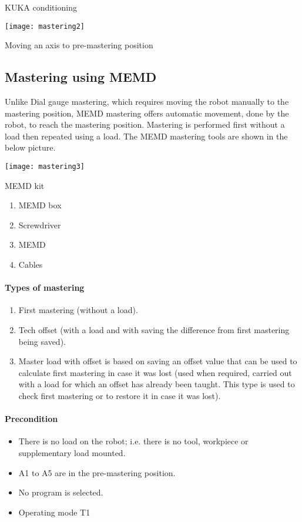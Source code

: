 \documentclass{book}
\begin{document}
\begin{chapter}{KUKA conditioning}
	
	\begin{center}
		\texttt{[image: mastering2]}
		\caption{Moving an axis to pre-mastering position}
	\end{center}
	
		\subsection{Mastering using MEMD}
		Unlike Dial gauge mastering, which requires moving the robot manually to the mastering position, MEMD mastering offers automatic movement, done by the robot, to reach the mastering position. Mastering is performed first without a load then repeated using a load. The MEMD mastering tools are shown in the below picture.
		

		\begin{minipage}{0.8\textwidth}	
			\texttt{[image: mastering3]}
			\begin{center}		
			\caption{MEMD kit}
			\end{center}
		\end{minipage} \hfill
		\begin{minipage}{0.5\textwidth}
			\begin{enumerate}
				\item MEMD box
				\item Screwdriver
				\item MEMD
				\item Cables
			\end{enumerate}
		\end{minipage}
		
		\bigskip
		\paragraph{Types of mastering}
		\begin{enumerate}
			\item First mastering (without a load).
			\item Tech offset (with a load and with saving the difference from first mastering being saved).
			\item Master load with offset is based on saving an offset value that can be used to calculate first mastering in case it was lost (used when required, carried out with a load for which an offset has already been taught. This type is used to check first mastering or to restore it in case it was lost).
		\end{enumerate}
		
		\paragraph{Precondition}
		\begin{itemize}
			\item There is no load on the robot; i.e. there is no tool, workpiece or supplementary load mounted.
			\item A1 to A5 are in the pre-mastering position.
			\item No program is selected.
			\item Operating mode T1
		\end{itemize}
		

\end{chapter}
\end{document}

